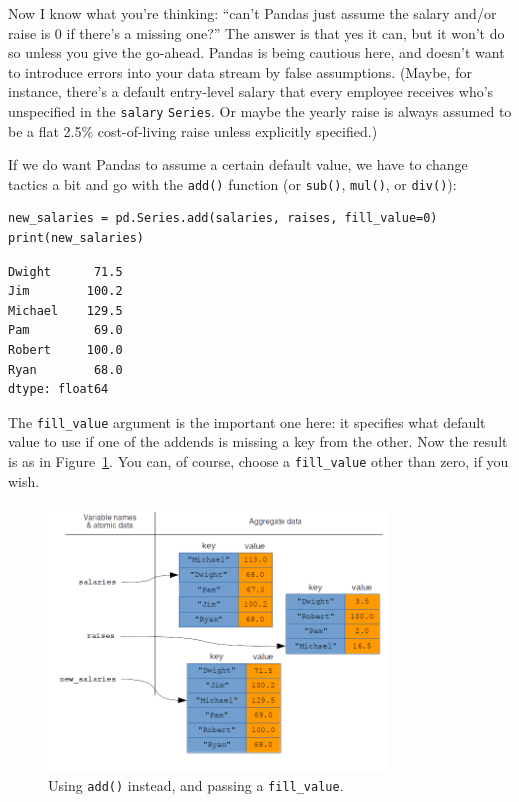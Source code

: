 Now I know what you're thinking: ``can't Pandas just assume the salary and/or
raise is 0 if there's a missing one?'' The answer is that yes it can, but it
won't do so unless you give the go-ahead. Pandas is being cautious here, and
doesn't want to introduce errors into your data stream by false assumptions.
(Maybe, for instance, there's a default entry-level salary that every employee
receives who's unspecified in the \texttt{salary} \texttt{Series}. Or maybe the
yearly raise is always assumed to be a flat 2.5\% cost-of-living raise unless
explicitly specified.)


If we do want Pandas to assume a certain default value, we have to change
tactics a bit and go with the \texttt{add()} function (or \texttt{sub()},
\texttt{mul()}, or \texttt{div()}):

\begin{Verbatim}[fontsize=\small,samepage=true,frame=single]
new_salaries = pd.Series.add(salaries, raises, fill_value=0)
print(new_salaries)
\end{Verbatim}

\begin{Verbatim}[fontsize=\small,samepage=true,frame=leftline,framesep=5mm,framerule=1mm]
Dwight      71.5
Jim        100.2
Michael    129.5
Pam         69.0
Robert     100.0
Ryan        68.0
dtype: float64
\end{Verbatim}

The \texttt{fill\_value} argument is the important one here: it specifies what
default value to use if one of the addends is missing a key from the other. Now
the result is as in Figure~\ref{fig:vectorizedPandas3}. You can, of course,
choose a \texttt{fill\_value} other than zero, if you wish.

\begin{figure}[ht]
\centering
\includegraphics[width=0.8\textwidth]{vectorizedPandas3.png}
\caption{Using \texttt{add()} instead, and passing a \texttt{fill\_value}.}
\label{fig:vectorizedPandas3}
\end{figure}


